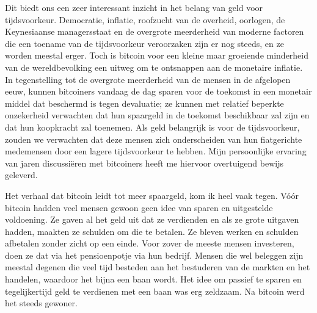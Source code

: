 Dit biedt ons een zeer interessant inzicht in het belang van geld voor tijdsvoorkeur. Democratie, inflatie, roofzucht van de overheid, oorlogen, de Keynesiaanse managersstaat en de overgrote meerderheid van moderne factoren die een toename van de tijdsvoorkeur veroorzaken zijn er nog steeds, en ze worden meestal erger. Toch is bitcoin voor een kleine maar groeiende minderheid van de wereldbevolking een uitweg om te ontsnappen aan de monetaire inflatie. In tegenstelling tot de overgrote meerderheid van de mensen in de afgelopen eeuw, kunnen bitcoiners vandaag de dag sparen voor de toekomst in een monetair middel dat beschermd is tegen devaluatie; ze kunnen met relatief beperkte onzekerheid verwachten dat hun spaargeld in de toekomst beschikbaar zal zijn en dat hun koopkracht zal toenemen. Als geld belangrijk is voor de tijdsvoorkeur, zouden we verwachten dat deze mensen zich onderscheiden van hun fiatgerichte medemensen door een lagere tijdsvoorkeur te hebben. Mijn persoonlijke ervaring van jaren discussiëren met bitcoiners heeft me hiervoor overtuigend bewijs geleverd.

Het verhaal dat bitcoin leidt tot meer spaargeld, kom ik heel vaak tegen. Vóór bitcoin hadden veel mensen gewoon geen idee van sparen en uitgestelde voldoening. Ze gaven al het geld uit dat ze verdienden en als ze grote uitgaven hadden, maakten ze schulden om die te betalen. Ze bleven werken en schulden afbetalen zonder zicht op een einde. Voor zover de meeste mensen investeren, doen ze dat via het pensioenpotje via hun bedrijf. Mensen die wel beleggen zijn meestal degenen die veel tijd besteden aan het bestuderen van de markten en het handelen, waardoor het bijna een baan wordt. Het idee om passief te sparen en tegelijkertijd geld te verdienen met een baan was erg zeldzaam. Na bitcoin werd het steeds gewoner.

